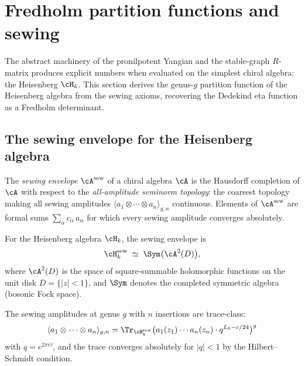 
\section{Fredholm partition functions and sewing}

The abstract machinery of the pronilpotent Yangian and the
stable-graph $R$-matrix produces explicit numbers when evaluated on
the simplest chiral algebra: the Heisenberg $\cH_k$. This section
derives the genus-$g$ partition function of the Heisenberg algebra
from the sewing axioms, recovering the Dedekind eta function as a
Fredholm determinant.

\subsection{The sewing envelope for the Heisenberg algebra}

\begin{definition}
The \emph{sewing envelope} $\cA^{\mathrm{sew}}$ of a chiral algebra
$\cA$ is the Hausdorff completion of $\cA$ with respect to the
\emph{all-amplitude seminorm topology}: the coarsest topology
making all sewing amplitudes $\langle a_1 \otimes \cdots \otimes a_n
\rangle_{g,n}$ continuous. Elements of $\cA^{\mathrm{sew}}$ are
formal sums $\sum_\alpha c_\alpha\, a_\alpha$ for which every
sewing amplitude converges absolutely.
\end{definition}

\begin{theorem}
For the Heisenberg algebra $\cH_k$, the sewing envelope is
\begin{equation}
\cH_k^{\mathrm{sew}}
\;\simeq\;
\Sym\bigl(\cA^2(D)\bigr),
\end{equation}
where $\cA^2(D)$ is the space of square-summable holomorphic
functions on the unit disk $D = \{|z| < 1\}$, and $\Sym$
denotes the completed symmetric algebra \textup{(}bosonic
Fock space\textup{)}.

The sewing amplitudes at genus $g$ with $n$ insertions are
trace-class:
\[
\langle a_1 \otimes \cdots \otimes a_n \rangle_{g,n}
= \Tr_{\cH_k^{\mathrm{sew}}}
\bigl(a_1(z_1) \cdots a_n(z_n) \cdot q^{L_0 - c/24}\bigr)^g
\]
with $q = e^{2\pi i\tau}$, and the trace converges absolutely
for $|q| < 1$ by the Hilbert--Schmidt condition.
\end{theorem}

